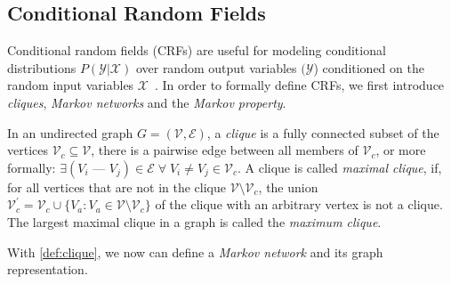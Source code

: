 \subsection{Conditional Random Fields}
\label{subsec:gm-crf}

Conditional random fields (CRFs) are useful for modeling conditional distributions
$P(\mathcal{Y}|\mathcal{X})$ over random output variables $(\mathcal{Y}$) conditioned on the random
input variables $\mathcal{X}$~\citep[142]{koller_09_probabilistic}. In order to
formally define CRFs, we first introduce \emph{cliques}, \emph{Markov networks} and the \emph{Markov
    property}.

\begin{mydef}
    \label{def:clique}
    In an undirected graph $G = (\mathcal{V}, \mathcal{E})$, a \emph{clique} is a fully connected
    subset of the vertices $\mathcal{V}_c\subseteq\mathcal{V}$, \ie there is a pairwise edge between
    all members of $\mathcal{V}_c$, or more formally: $\exists (V_i \textbf{ --- } V_j) \in
    \mathcal{E}\; \forall \; V_i \ne V_j \in \mathcal{V}_c$. A clique is called \emph{maximal
        clique}, if, for all vertices that are not in the clique $\mathcal{V} \setminus
    \mathcal{V}_c$, the union $\mathcal{V}_c^{\prime} = \mathcal{V}_c \cup \{V_a : V_a \in
    \mathcal{V} \setminus \mathcal{V}_c\}$ of the clique with an arbitrary vertex is not a
    clique. The largest maximal clique in a graph is called the \emph{maximum clique}.
\end{mydef}

With \cref{def:clique}, we now can define a \emph{Markov network} and its graph representation.

